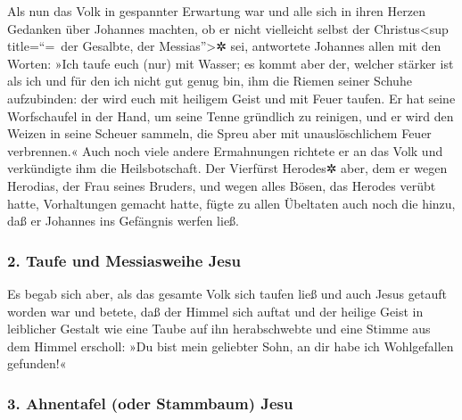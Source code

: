  Als nun das Volk in gespannter Erwartung war und alle
sich in ihren Herzen Gedanken über Johannes machten, ob er nicht
vielleicht selbst der Christus\textless sup title=``=~der Gesalbte, der
Messias''\textgreater✲ sei,  antwortete Johannes allen
mit den Worten: »Ich taufe euch (nur) mit Wasser; es kommt aber der,
welcher stärker ist als ich und für den ich nicht gut genug bin, ihm die
Riemen seiner Schuhe aufzubinden: der wird euch mit heiligem Geist und
mit Feuer taufen.  Er hat seine Worfschaufel in der Hand,
um seine Tenne gründlich zu reinigen, und er wird den Weizen in seine
Scheuer sammeln, die Spreu aber mit unauslöschlichem Feuer verbrennen.«
 Auch noch viele andere Ermahnungen richtete er an das
Volk und verkündigte ihm die Heilsbotschaft.  Der
Vierfürst Herodes✲ aber, dem er wegen Herodias, der Frau seines Bruders,
und wegen alles Bösen, das Herodes verübt hatte, Vorhaltungen gemacht
hatte,  fügte zu allen Übeltaten auch noch die hinzu, daß
er Johannes ins Gefängnis werfen ließ.

\hypertarget{taufe-und-messiasweihe-jesu}{%
\subsubsection{2. Taufe und Messiasweihe
Jesu}\label{taufe-und-messiasweihe-jesu}}

 Es begab sich aber, als das gesamte Volk sich taufen
ließ und auch Jesus getauft worden war und betete, daß der Himmel sich
auftat  und der heilige Geist in leiblicher Gestalt wie
eine Taube auf ihn herabschwebte und eine Stimme aus dem Himmel
erscholl: »Du bist mein geliebter Sohn, an dir habe ich Wohlgefallen
gefunden!«

\hypertarget{ahnentafel-oder-stammbaum-jesu}{%
\subsubsection{3. Ahnentafel (oder Stammbaum)
Jesu}\label{ahnentafel-oder-stammbaum-jesu}}

